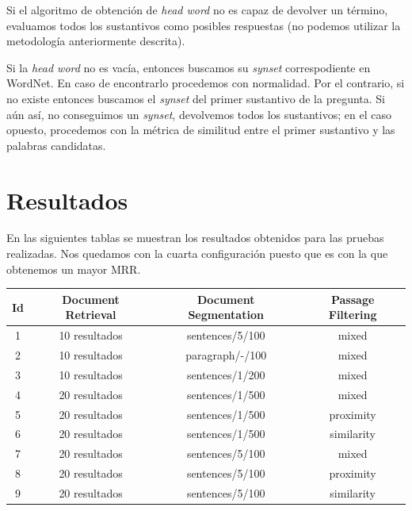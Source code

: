 \documentclass[12pt,a4paper,titlepage]{article}
\begin{document}
Si el algoritmo de obtención de \emph{head word} no es capaz de devolver un término, evaluamos todos los sustantivos como posibles respuestas (no podemos utilizar la metodología anteriormente descrita).

Si la \emph{head word} no es vacía, entonces buscamos su \emph{synset} correspodiente en WordNet. En caso de encontrarlo procedemos con normalidad. Por el contrario, si no existe entonces buscamos el \emph{synset} del primer sustantivo de la pregunta. Si aún así, no conseguimos un \emph{synset}, devolvemos todos los sustantivos; en el caso opuesto, procedemos con la métrica de similitud entre el primer sustantivo y las palabras candidatas.

\clearpage
\section{Resultados}
En las siguientes tablas se muestran los resultados obtenidos para las pruebas realizadas. Nos quedamos con la cuarta configuración puesto que es con la que obtenemos un mayor MRR.

\begin{table}[h!]
\begin{center}
\begin{tabular}{|c|c|c|c|}
\hline
Id & Document Retrieval & Document Segmentation & Passage Filtering\\\hline
1 & 10 resultados & sentences/5/100 & mixed\\\hline
2 & 10 resultados & paragraph/-/100 & mixed\\\hline
3 & 10 resultados & sentences/1/200 & mixed\\\hline
4 & 20 resultados & sentences/1/500 & mixed\\\hline
5 & 20 resultados & sentences/1/500 & proximity\\\hline
6 & 20 resultados & sentences/1/500 & similarity\\\hline
7 & 20 resultados & sentences/5/100 & mixed\\\hline
8 & 20 resultados & sentences/5/100 & proximity\\\hline
9 & 20 resultados & sentences/5/100 & similarity\\\hline
\end{tabular}
\end{center}
\end{table}
\end{document}
